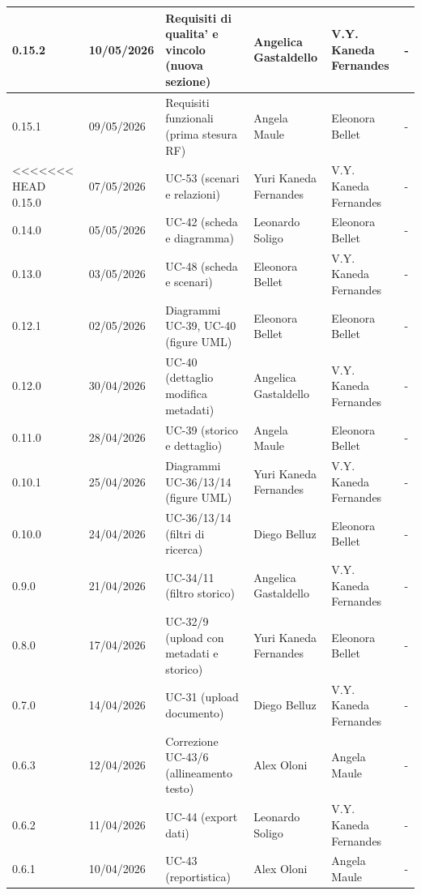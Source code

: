 ﻿\documentclass[a4paper,12pt]{article}
\begin{document}
{\begin{longtable}{|p{1.2cm}|p{1.9cm}|p{4.3cm}|p{2.8cm}|p{2.1cm}|p{2.1cm}|}
    \hline
    0.15.2 & 10/05/2026 & Requisiti di qualita' e vincolo (nuova sezione) & Angelica Gastaldello & V.Y. Kaneda Fernandes & - \\
    \hline
    \rowcolor{gray!8} 0.15.1 & 09/05/2026 & Requisiti funzionali (prima stesura RF) & Angela Maule & Eleonora Bellet & - \\
    \hline
<<<<<<< HEAD
    0.15.0 & 07/05/2026 & UC-53 (scenari e relazioni) & Yuri Kaneda Fernandes & V.Y. Kaneda Fernandes & - \\
    \hline
    \rowcolor{gray!8} 0.14.0 & 05/05/2026 & UC-42 (scheda e diagramma) & Leonardo Soligo & Eleonora Bellet & - \\
    \hline
    0.13.0 & 03/05/2026 & UC-48 (scheda e scenari) & Eleonora Bellet & V.Y. Kaneda Fernandes & - \\
    \hline
    \rowcolor{gray!8} 0.12.1 & 02/05/2026 & Diagrammi UC-39, UC-40 (figure UML) & Eleonora Bellet & Eleonora Bellet & - \\
    \hline
    0.12.0 & 30/04/2026 & UC-40 (dettaglio modifica metadati) & Angelica Gastaldello & V.Y. Kaneda Fernandes & - \\
    \hline
    \rowcolor{gray!8} 0.11.0 & 28/04/2026 & UC-39 (storico e dettaglio) & Angela Maule & Eleonora Bellet & - \\
    \hline
    \rowcolor{gray!8} 0.10.1 & 25/04/2026 & Diagrammi UC-36/13/14 (figure UML) & Yuri Kaneda Fernandes & V.Y. Kaneda Fernandes & - \\
    \hline
    0.10.0 & 24/04/2026 & UC-36/13/14 (filtri di ricerca) & Diego Belluz & Eleonora Bellet & - \\
    \hline
    \rowcolor{gray!8} 0.9.0 & 21/04/2026 & UC-34/11 (filtro storico) & Angelica Gastaldello & V.Y. Kaneda Fernandes & - \\
    \hline
    \rowcolor{gray!8} 0.8.0 & 17/04/2026 & UC-32/9 (upload con metadati e storico) & Yuri Kaneda Fernandes & Eleonora Bellet & - \\
    \hline
    0.7.0 & 14/04/2026 & UC-31 (upload documento) & Diego Belluz & V.Y. Kaneda Fernandes & - \\
    \hline
    0.6.3 & 12/04/2026 & Correzione UC-43/6 (allineamento testo) & Alex Oloni & Angela Maule & - \\
    \hline
    \rowcolor{gray!8} 0.6.2 & 11/04/2026 & UC-44 (export dati) & Leonardo Soligo & V.Y. Kaneda Fernandes & - \\
    \hline
    0.6.1 & 10/04/2026 & UC-43 (reportistica) & Alex Oloni & Angela Maule & - \\

\end{longtable}}
\end{document}
